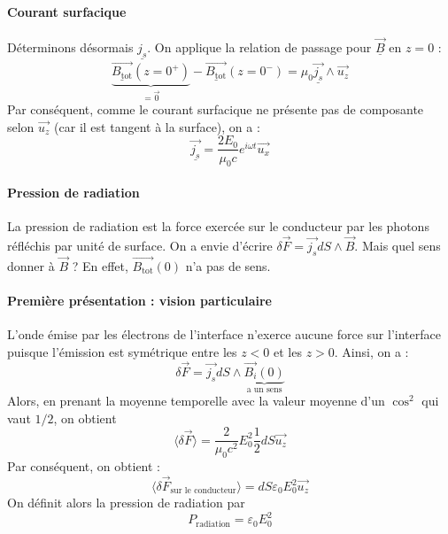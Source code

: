 \documentclass[french]{book}
\theoremstyle{plain}
\theoremstyle{definition}
\theoremstyle{remark}
\begin{document}
\paragraph{Courant surfacique} Déterminons désormais $\underline{j_s}$. On applique la relation de passage pour $\underline{\overrightarrow{B}}$ en $z=0$ : $$\underbrace{\underline{\overrightarrow{B_\text{tot}}}(z=0^+)}_{=\overrightarrow{0}}-\underline{\overrightarrow{B_\text{tot}}}(z=0^-)=\mu_0\underline{\overrightarrow{j_s}}\wedge\overrightarrow{u_z}$$
Par conséquent, comme le courant surfacique ne présente pas de composante selon $\overrightarrow{u_z}$ (car il est tangent à la surface), on a : $$\underline{\overrightarrow{j_s}}=\frac{2E_0}{\mu_0 c}e^{i\omega t}\overrightarrow{u_x}$$
\paragraph{Pression de radiation} La pression de radiation est la force exercée sur le conducteur par les photons réfléchis par	unité de surface. On a envie d'écrire $\delta\overrightarrow{F}=\overrightarrow{j_s}dS\wedge\overrightarrow{B}$. Mais quel sens donner à $\overrightarrow{B}$ ? En effet, $\overrightarrow{B_\text{tot}}(0)$ n'a pas de sens.
\paragraph{Première présentation : vision particulaire} L'onde émise par les électrons de l'interface n'exerce aucune force sur l'interface puisque l'émission est symétrique entre les $z<0$ et les $z>0$. Ainsi, on a : $$\delta\overrightarrow{F}=\overrightarrow{j_s}dS\wedge\underbrace{\overrightarrow{B_i}(0)}_{\text{a un sens}}$$ Alors, en prenant la moyenne temporelle avec la valeur moyenne d'un $\cos^2$ qui vaut $1/2$, on obtient $$\langle\delta\overrightarrow{F}\rangle=\frac{2}{\mu_0 c^2}E_0^2\frac{1}{2}dS\overrightarrow{u_z}$$ Par conséquent, on obtient : $$\langle\delta\overrightarrow{F}_\text{sur le conducteur}\rangle=dS\varepsilon_0E_0^2\overrightarrow{u_z}$$ On définit alors la pression de radiation par $$P_\text{radiation}=\varepsilon_0E_0^2$$
\end{document}
